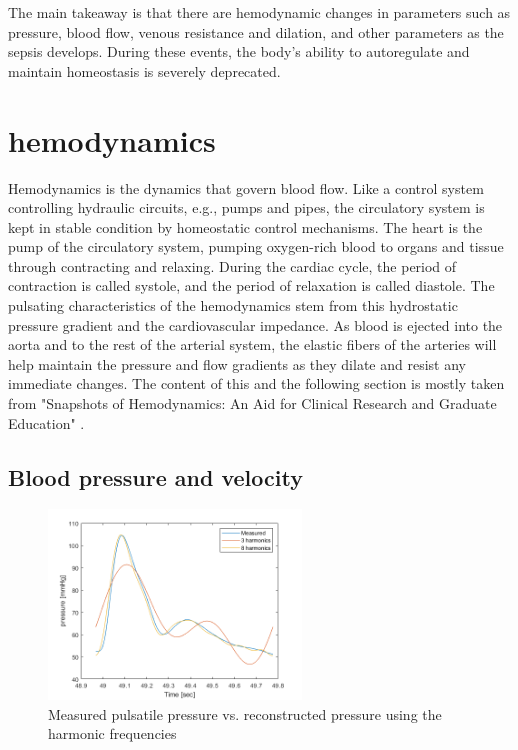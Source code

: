 The main takeaway is that there are hemodynamic changes in parameters such as pressure, blood flow, venous resistance and dilation, and other parameters as the sepsis develops. During these events, the body's ability to autoregulate and maintain homeostasis is severely deprecated.



\section{hemodynamics}\label{sect:hemodynamics}

Hemodynamics is the dynamics that govern blood flow. Like a control system controlling hydraulic circuits, e.g., pumps and pipes, the circulatory system is kept in stable condition by homeostatic control mechanisms. The heart is the pump of the circulatory system, pumping oxygen-rich blood to organs and tissue through contracting and relaxing. During the cardiac cycle, the period of contraction is called systole, and the period of relaxation is called diastole. The pulsating characteristics of the hemodynamics stem from this hydrostatic pressure gradient and the cardiovascular impedance. As blood is ejected into the aorta and to the rest of the arterial system, the elastic fibers of the arteries will help maintain the pressure and flow gradients as they dilate and resist any immediate changes. The content of this and the following section is mostly taken from "Snapshots of Hemodynamics: An Aid for Clinical Research and Graduate Education" \cite{RN11}.


\subsection{Blood pressure and velocity}

\begin{figure}[t!]
    \centering
    \includegraphics[width=0.6\textwidth]{fig/theory/reconstruct_pressure.png}
    \caption{Measured pulsatile pressure vs. reconstructed pressure using the harmonic frequencies}
    \label{fig:reconstruct_pressure}
\end{figure}{}

